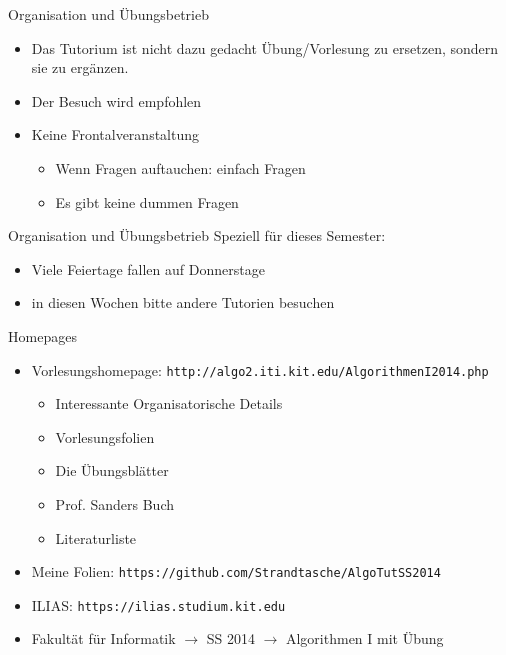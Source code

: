 \documentclass[18pt]{beamer}
\begin{document}
	\begin{frame}{Organisation und Übungsbetrieb}
		\begin{itemize}
			\item Das Tutorium ist nicht dazu gedacht Übung/Vorlesung zu ersetzen, sondern sie zu ergänzen.
			\item Der Besuch wird empfohlen
			\item Keine Frontalveranstaltung
			\begin{itemize}
				\item Wenn Fragen auftauchen: einfach Fragen
				\item Es gibt keine dummen Fragen
			\end{itemize}
		\end{itemize}
	\end{frame}

	\begin{frame}{Organisation und Übungsbetrieb}
		Speziell für dieses Semester:
		\begin{itemize}
			\item Viele Feiertage fallen auf Donnerstage
			\item in diesen Wochen bitte andere Tutorien besuchen 
		\end{itemize}		
	\end{frame}

	\begin{frame}{Homepages}
		\begin{itemize}
			\item Vorlesungshomepage: \texttt{http://algo2.iti.kit.edu/AlgorithmenI2014.php}
			\begin{itemize}
				\item Interessante Organisatorische Details
				\item Vorlesungsfolien
				\item Die Übungsblätter
				\item Prof. Sanders Buch
				\item Literaturliste
			\end{itemize}
			\item Meine Folien: \texttt{https://github.com/Strandtasche/AlgoTutSS2014}
			\item ILIAS: \texttt{https://ilias.studium.kit.edu}
			\item Fakultät für Informatik $\rightarrow$ SS 2014 $\rightarrow$ Algorithmen I mit Übung			
		\end{itemize}		
	\end{frame}
\end{document}
